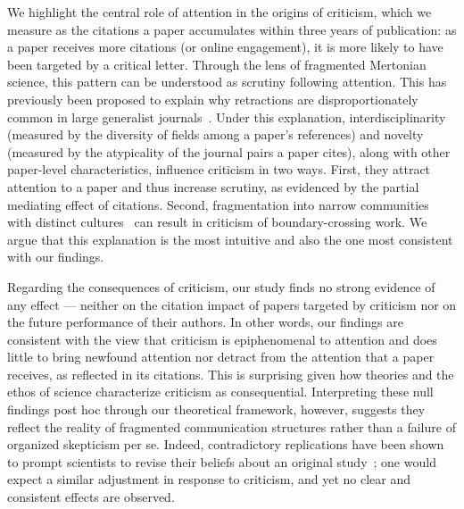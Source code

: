 \documentclass[12pt,a4paper]{article}
\numberwithin{equation}{section}
\begin{document}
We highlight the central role of attention in the origins of criticism, which we measure as the citations a paper accumulates within three years of publication: as a paper receives more citations (or online engagement), it is more likely to have been targeted by a critical letter. 
Through the lens of fragmented Mertonian science, this pattern can be understood as scrutiny following attention.
This has previously been proposed to explain why retractions are disproportionately common in large generalist journals~\cite{cokol_2007_retracted}.
Under this explanation, interdisciplinarity (measured by the diversity of fields among a paper's references) and novelty (measured by the atypicality of the journal pairs a paper cites), along with other paper-level characteristics, influence criticism in two ways.
First, they attract attention to a paper and thus increase scrutiny, as evidenced by the partial mediating effect of citations.
Second, fragmentation into narrow communities with distinct cultures~\cite{leydesdorff2001sociological,zollman2007network} can result in criticism of boundary-crossing work.
We argue that this explanation is the most intuitive and also the one most consistent with our findings.

Regarding the consequences of criticism, our study finds no strong evidence of any effect --- neither on the citation impact of papers targeted by criticism nor on the future performance of their authors.
In other words, our findings are consistent with the view that criticism is epiphenomenal to attention and does little to bring newfound attention nor detract from the attention that a paper receives, as reflected in its citations.
This is surprising given how theories and the ethos of science characterize criticism as consequential. Interpreting these null findings post hoc through our theoretical framework, however, suggests they reflect the reality of fragmented communication structures rather than a failure of organized skepticism per se.
Indeed, contradictory replications have been shown to prompt scientists to revise their beliefs about an original study~\cite{mcdiarmid_2021_replication}; one would expect a similar adjustment in response to criticism, and yet no clear and consistent effects are observed. 
\end{document}
